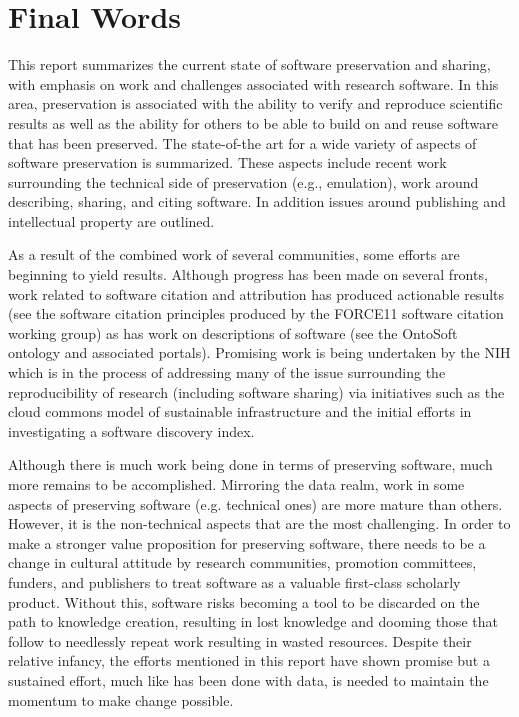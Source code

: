 \documentclass[letterpaper,11pt]{article}
\begin{document}
\section{Final Words}
This report summarizes the current state of software preservation and sharing, with emphasis on work and challenges associated with research software. In this area, preservation is associated with the ability to verify and reproduce scientific results as well as the ability for others to be able to build on and reuse software that has been preserved. The state-of-the art for a wide variety of aspects of software preservation is summarized. These aspects include recent work surrounding the technical side of preservation (e.g., emulation), work around describing, sharing, and citing software. In addition issues around publishing and intellectual property are outlined.

As a result of the combined work of several communities, some efforts are beginning to yield results. Although progress has been made on several fronts, work related to software citation and attribution has produced actionable results (see the software citation principles produced by the FORCE11 software citation working group) as has work on descriptions of software (see the OntoSoft ontology and associated portals). Promising work is being undertaken by the NIH which is in the process of addressing many of the issue surrounding the reproducibility of research (including software sharing) via initiatives such as the cloud commons model of sustainable infrastructure and the initial efforts in investigating a software discovery index.

Although there is much work being done in terms of preserving software, much more remains to be accomplished. Mirroring the data realm, work in some aspects of preserving software (e.g. technical ones) are more mature than others. However, it is the non-technical aspects that are the most challenging. In order to make a stronger value proposition for preserving software, there needs to be a change in cultural attitude by research communities, promotion committees, funders, and publishers to treat software as a valuable first-class scholarly product. Without this, software risks becoming a tool to be discarded on the path to knowledge creation, resulting in lost knowledge and dooming those that follow to needlessly repeat work resulting in wasted resources. Despite their relative infancy, the efforts mentioned in this report have shown promise but a sustained effort, much like has been done with data, is needed to maintain the momentum to make change possible. 
\end{document}
